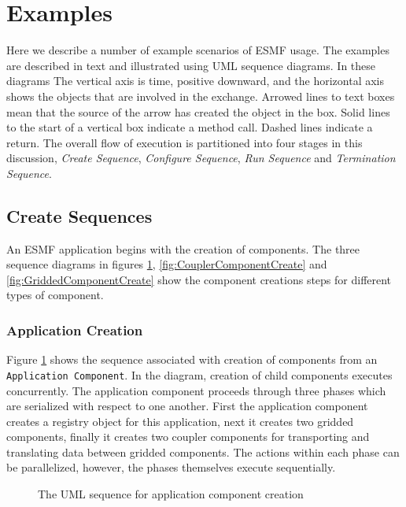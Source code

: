 \section{Examples}

Here we describe a number of example scenarios of ESMF usage. The examples are
described in text and illustrated using UML sequence diagrams. In these diagrams
The vertical axis is time, positive
downward, and the horizontal axis shows the objects that are involved in the
exchange.  Arrowed lines to text boxes mean that the source of the arrow has
created the object in the box.  Solid lines to the start of a vertical
box indicate a method call.  Dashed lines indicate a return.
The overall flow of execution is partitioned into four stages in this
discussion, {\it Create Sequence}, {\it Configure Sequence}, {\it Run Sequence}
and {\it Termination Sequence}.
 
\subsection{Create Sequences}

An ESMF application begins with the creation of components. The
three sequence diagrams in figures \ref{fig:ApplicationComponentCreate}, 
\ref{fig:CouplerComponentCreate} and 
\ref{fig:GriddedComponentCreate} show the
component creations steps for different types of component.


\subsubsection{Application Creation}
Figure \ref{fig:ApplicationComponentCreate} shows the sequence associated with
creation of components from an {\tt Application Component}. In the diagram,
creation of child components executes concurrently. The application component
proceeds through three phases which are serialized with respect to one another.
First the application component creates a registry object for this application,
next it creates two gridded components, finally it creates two coupler
components for transporting and translating data between gridded components.
The actions within each phase can be parallelized, however, the phases
themselves execute sequentially.
\begin{figure}
\caption[{Application Component Create}]
{The UML sequence for application component creation}
\label{fig:ApplicationComponentCreate}
\end{figure}

